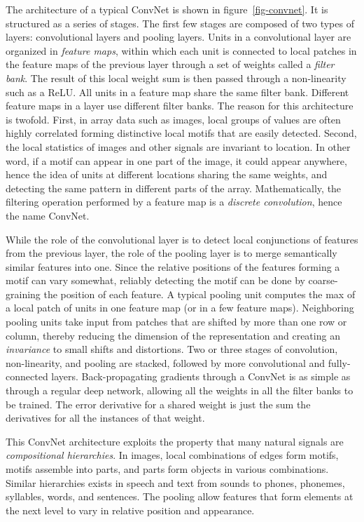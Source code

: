 \documentclass[10pts]{article}
\begin{document}
The architecture of a typical ConvNet is shown in
figure~\ref{fig-convnet}.  It is structured as a series of stages. The
first few stages are composed of two types of layers: convolutional
layers and pooling layers. Units in a convolutional layer are
organized in {\em feature maps}, within which each unit is connected
to local patches in the feature maps of the previous layer through a
set of weights called a {\em filter bank}. The result of this local
weight sum is then passed through a non-linearity such as a ReLU.  All
units in a feature map share the same filter bank. Different feature
maps in a layer use different filter banks. The reason for this
architecture is twofold. First, in array data such as images, local
groups of values are often highly correlated forming distinctive local
motifs that are easily detected. Second, the local statistics of
images and other signals are invariant to location. In other word, if
a motif can appear in one part of the image, it could appear anywhere,
hence the idea of units at different locations sharing the same
weights, and detecting the same pattern in different parts of the
array.  Mathematically, the filtering operation performed by a feature
map is a {\em discrete convolution}, hence the name ConvNet.

While the role of the convolutional layer is to detect local
conjunctions of features from the previous layer, the role of the
pooling layer is to merge semantically similar features into
one. Since the relative positions of the features forming a motif can
vary somewhat, reliably detecting the motif can be done by
coarse-graining the position of each feature. A typical pooling unit
computes the max of a local patch of units in one feature map (or in a
few feature maps). Neighboring pooling units take input from patches
that are shifted by more than one row or column, thereby reducing the
dimension of the representation and creating an {\em invariance} to
small shifts and distortions.  Two or three stages of convolution,
non-linearity, and pooling are stacked, followed by more convolutional
and fully-connected layers.  Back-propagating gradients through a
ConvNet is as simple as through a regular deep network, allowing all
the weights in all the filter banks to be trained. The error
derivative for a shared weight is just the sum the derivatives for all
the instances of that weight.

This ConvNet architecture exploits the property that many natural
signals are {\em compositional hierarchies}. In images, local
combinations of edges form motifs, motifs assemble into parts, and
parts form objects in various combinations.  Similar hierarchies
exists in speech and text from sounds to phones, phonemes, syllables,
words, and sentences. The pooling allow features that form elements at
the next level to vary in relative position and appearance. 
\end{document}
